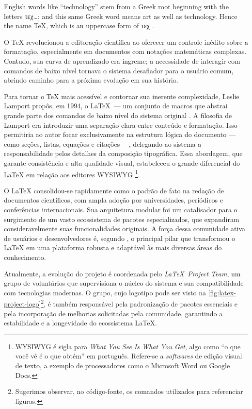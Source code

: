 \begin{citacao}[english]
English words like ``technology'' stem from a Greek root beginning with the letters \textgreek{τεχ}\ldots; and this same Greek word means art as well as technology. Hence the name \TeX, which is an uppercase form of \textgreek{τεχ} \cite{Knuth1984}.
\end{citacao}

O \TeX{} revolucionou a editoração científica ao oferecer um controle inédito sobre a formatação, especialmente em documentos com notações matemáticas complexas. Contudo, sua curva de aprendizado era íngreme; a necessidade de interagir com comandos de baixo nível tornava o sistema desafiador para o usuário comum, abrindo caminho para a próxima evolução em sua história.

Para tornar o \TeX{} mais acessível e contornar sua inerente complexidade, Leslie Lamport propôs, em 1994, o \LaTeX\ --- um conjunto de macros que abstrai grande parte dos comandos de baixo nível do sistema original \cite{Lamport1994}. A filosofia de Lamport era introduzir uma separação clara entre conteúdo e formatação. Isso permitiria ao autor focar exclusivamente na estrutura lógica do documento --- como seções, listas, equações e citações ---, delegando ao sistema a responsabilidade pelos detalhes da composição tipográfica. Essa abordagem, que garante consistência e alta qualidade visual, estabeleceu o grande diferencial do \LaTeX{} em relação aos editores WYSIWYG%
\footnote{WYSIWYG é sigla para \emph{\foreignlanguage{english}{What You See Is What You Get}}, algo como ``o que você vê é o que obtém'' em português. Refere-se a \emph{softwares} de edição visual de texto, a exemplo de processadores como o Microsoft Word ou Google Docs.}.

O \LaTeX{} consolidou-se rapidamente como o padrão de fato na redação de documentos científicos, com ampla adoção por universidades, periódicos e conferências internacionais. Sua arquitetura modular foi um catalisador para o surgimento de um vasto ecossistema de pacotes especializados, que expandiram consideravelmente suas funcionalidades originais. A força dessa comunidade ativa de usuários e desenvolvedores é, segundo \textcite{Mittelbach2004}, o principal pilar que transformou o \LaTeX{} em uma plataforma robusta e adaptável às mais diversas áreas do conhecimento.

Atualmente, a evolução do projeto é coordenada pelo \textit{\LaTeX\ Project Team}, um grupo de voluntários que supervisiona o núcleo do sistema e sua compatibilidade com tecnologias modernas. O grupo, cujo logotipo pode ser visto na \autoref{fig:latex-project-logo}\footnote{Sugerimos observar, no código-fonte, os comandos utilizados para referenciar figuras.}, é também responsável pela padronização de pacotes essenciais e pela incorporação de melhorias solicitadas pela comunidade, garantindo a estabilidade e a longevidade do ecossistema \LaTeX.

